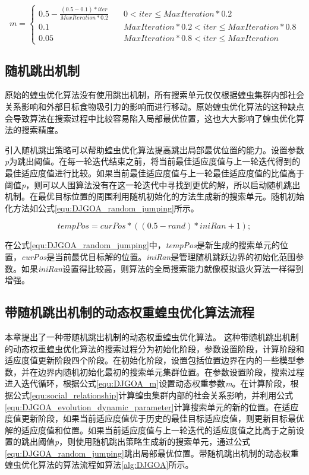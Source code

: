 \begin{equation}\label{equ:DJGOA_m}
    m= \begin{cases}
        0.5-\frac{(0.5-0.1)*iter}{MaxIteration*0.2} & \quad 0<iter\leq MaxIteration*0.2 \\
        0.1&\quad MaxIteration*0.2<iter \leq MaxIteration*0.8 \\
        0.05& \quad  MaxIteration*0.8 < iter \leq MaxIteration
        \end{cases} 
\end{equation}

\subsection{随机跳出机制}

原始的蝗虫优化算法没有使用跳出机制，所有搜索单元仅仅根据蝗虫集群内部社会关系影响和外部目标食物吸引力的影响而进行移动。原始蝗虫优化算法的这种缺点会导致算法在搜索过程中比较容易陷入局部最优位置，这也大大影响了蝗虫优化算法的搜索精度。

引入随机跳出策略可以帮助蝗虫优化算法提高跳出局部最优位置的能力。设置参数\emph{p}为跳出阈值。在每一轮迭代结束之前，将当前最佳适应度值与上一轮迭代得到的最佳适应度值进行比较。如果当前最佳适应度值与上一轮最佳适应度值的比值高于阈值\emph{p}，则可以人围算法没有在这一轮迭代中寻找到更优的解，所以启动随机跳出机制。在最优目标位置的周围利用随机初始化的方法生成新的搜索单元。随机初始化方法如公式\ref{equ:DJGOA_random_jumping}所示。

\begin{equation}\label{equ:DJGOA_random_jumping}
    tempPos=curPos*((0.5-rand)*iniRan+1);
\end{equation} 

在公式\ref{equ:DJGOA_random_jumping}中，\emph{tempPos}是新生成的搜索单元的位置，\emph{curPos}是当前最优目标解的位置。\emph{iniRan}是管理随机跳跃边界的初始化范围参数。如果\emph{iniRan}设置得比较高，则算法的全局搜索能力就像模拟退火算法一样得到增强。

\subsection{带随机跳出机制的动态权重蝗虫优化算法流程}

本章提出了一种带随机跳出机制的动态权重蝗虫优化算法。 这种带随机跳出机制的动态权重蝗虫优化算法的搜索过程分为初始化阶段，参数设置阶段，计算阶段和适应度值更新阶段四个阶段。在初始化阶段，设置包括位置边界在内的一些模型参数，并在边界内随机初始化最初的搜索单元集群位置。在参数设置阶段，搜索过程进入迭代循环，根据公式\ref{equ:DJGOA_m}设置动态权重参数\emph{m}。在计算阶段，根据公式\ref{equ:social_relationship}计算蝗虫集群内部的社会关系影响，并利用公式\ref{equ:DJGOA_evolution_dynamic_parameter}计算搜索单元的新的位置。在适应度值更新阶段，如果当前适应度值优于历史的最佳目标适应度值，则更新目标最优解的适应度值和位置。如果当前适应度值与上一轮迭代的适应度值之比高于之前设置的跳出阈值\emph{p}，则使用随机跳出策略生成新的搜索单元，通过公式\ref{equ:DJGOA_random_jumping}跳出局部最优位置。带随机跳出机制的动态权重蝗虫优化算法的算法流程如算法\ref{alg:DJGOA}所示。


